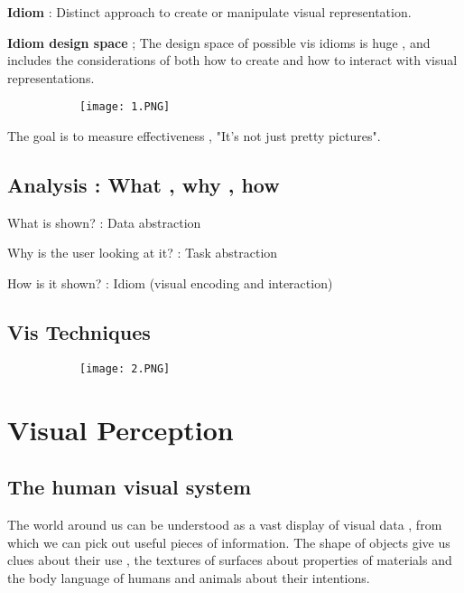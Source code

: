 \documentclass{article}
\begin{document}
\textbf{Idiom} : Distinct approach to create or manipulate visual representation.

\textbf{Idiom design space} ; The design space of possible vis idioms is huge , and includes the considerations of both how to create and how to interact with visual representations.

\begin{figure}[ht!]
  \centering
  \begin{subfigure}[b]{0.5\linewidth}
    \texttt{[image: 1.PNG]}
  \end{subfigure}
\end{figure}

The goal is to measure effectiveness , "It's not just pretty pictures".

\subsection{Analysis : What , why , how}

What is shown? : Data abstraction

Why is the user looking at it? : Task abstraction

How is it shown? : Idiom (visual encoding and interaction)

\subsection{Vis Techniques}

\begin{figure}[ht!]
  \centering
  \begin{subfigure}[b]{0.5\linewidth}
    \texttt{[image: 2.PNG]}
  \end{subfigure}
\end{figure}


\section{Visual Perception}

\subsection{The human visual system}

The world around us can be understood as a vast display of visual data , from which we can pick out useful pieces of information. The shape of objects give us clues about their use , the textures of surfaces about properties of materials and the body language of humans and animals about their intentions.
\end{document}
